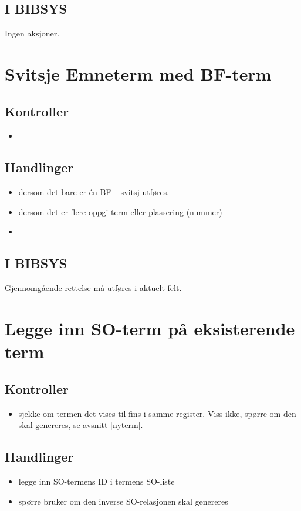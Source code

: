 \documentclass[a4paper,10pt,norsk]{article}
\begin{document}
\subsection*{I BIBSYS}
Ingen aksjoner.

\section{Svitsje Emneterm med BF-term}\label{svitsje}
\subsection*{Kontroller}
\begin{itemize}
\item 
\end{itemize}
\subsection*{Handlinger}
\begin{itemize}
\item dersom det bare er én BF -- svitsj utføres.
\item dersom det er flere oppgi term eller plassering (nummer)
\item
\end{itemize}
\subsection*{I BIBSYS}
Gjennomgående rettelse må utføres i aktuelt felt.

\section{Legge inn SO-term på eksisterende term}
\subsection*{Kontroller}
\begin{itemize}
\item sjekke om termen det vises til  fins i samme register. Viss ikke, spørre om den skal genereres, se avsnitt \ref{nyterm}.
\end{itemize}
\subsection*{Handlinger}
\begin{itemize}
\item legge inn SO-termens ID i termens SO-liste
\item spørre bruker om den inverse SO-relasjonen skal genereres
\end{itemize}
\end{document}
